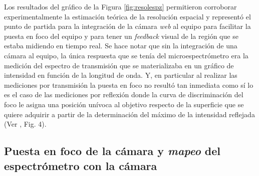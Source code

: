 Los resultados del gráfico de la Figura \ref{fig:resolespz} permitieron corroborar experimentalmente la estimación teórica de la resolución espacial y representó el punto de partida para la integración de la cámara \textit{web} al equipo para facilitar la puesta en foco del equipo y para tener un \textit{feedback} visual de la región que se estaba midiendo en tiempo real. Se hace notar que sin la integración de una cámara al equipo, la única respuesta que se tenía del microespectrómetro era la medición del espectro de transmisión que se materializaba en un gráfico de intensidad en función de la longitud de onda. Y, en particular al realizar las mediciones por transmisión la puesta en foco no resultó tan inmediata como sí lo es el caso de las mediciones por reflexión donde la curva de discriminación del foco le asigna una posición unívoca al objetivo respecto de la superficie que se quiere adquirir a partir de la determinación del máximo de la intensidad reflejada (Ver \cite{mour}, Fig. 4). 


\singlespacing
\subsection{Puesta en foco de la cámara y \textit{mapeo} del espectrómetro con la cámara}
\label{sec:fococam}

